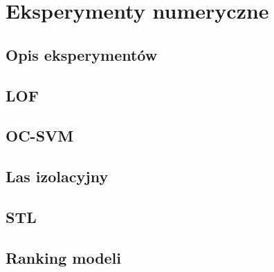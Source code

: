 \section{Eksperymenty numeryczne}
\label{section:eksp}


\subsection{Opis eksperymentów}
\label{subsection:eksp-opis}


\subsection{LOF}
\label{subsection:eksp-lof}


\subsection{OC-SVM}
\label{subsection:eksp-svm}


\subsection{Las izolacyjny}
\label{subsection:eksp-las}


\subsection{STL}
\label{subsection:eksp-stl}


\subsection{Ranking modeli}
\label{subsection:ranking}

